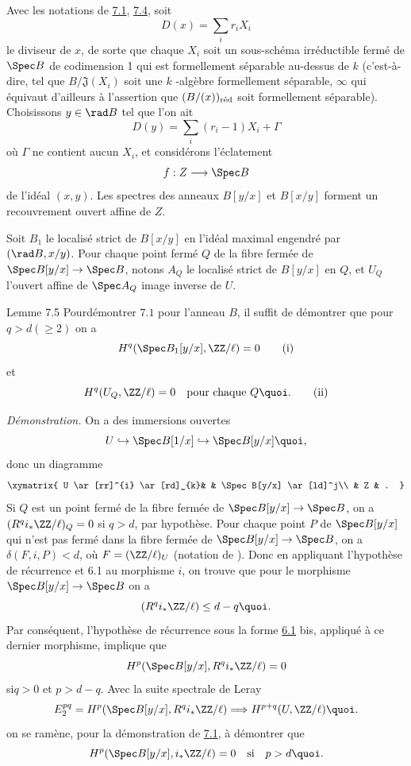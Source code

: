 \documentclass[10pt]{../fichiers-configuration-latex/smfart}
\begin{document}
Avec les notations de \hyperref[XIX.lem7.1]{7.1}, \hyperref[XIX.cor7.4]{7.4}, soit
$$
D(x)=\sum_{i}r_{i}X_{i}
$$
le diviseur de $x$, de sorte que chaque $X_{i}$ soit un sous-schéma
irréductible fermé de $\Spec B$ de codimension 1 qui est formellement
séparable au-dessus de $k$ (c'est-à-dire, tel que
$B/\mathfrak{J}(X_{i})$ soit une $k$ -algèbre formellement séparable,
$\infty$ qui équivaut d'ailleurs à l'assertion que $(B/(x))_{\text{\rm
réd}}$ soit formellement séparable). Choisissons $y\in\rad B$ tel que
l'on ait
$$
D(y)=\sum_{i}(r_{i}-1)X_{i}+\Gamma
$$
où $\Gamma$ ne contient aucun $X_{i}$, et considérons l'éclatement
$$
f:Z\longrightarrow \Spec B
$$
de l'idéal $(x,y)$. Les spectres des anneaux $B[y/x]$ et $B[x/y]$
forment un recouvrement ouvert affine de $Z$.

Soit $B_{1}$ le localisé strict de $B[x/y]$ en l'idéal maximal
engendré par $(\rad B,x/y)$. Pour chaque point fermé $Q$ de la fibre
fermée de $\Spec B[y/x]\rightarrow \Spec B$, notons $A_{Q}$ le
localisé strict de $B[y/x]$ en $Q$, et $U_{Q}$ l'ouvert affine de
$\Spec A_{Q}$ image inverse de $U$.

\begin{enonce*}{Lemme 7.5}
Pour\pageoriginale démontrer $7.1$ pour l'anneau $B$, il suffit de
démontrer que pour $q>d(\geq 2)$ on a
\begin{equation*}
H^{q}(\Spec B_{1}[y/x],\ZZ/\ell)=0\tag{i}
\end{equation*}
et
\begin{equation*}
H^{q}(U_{Q},\ZZ/\ell)=0\quad\text{pour chaque $Q$}{\quoi}.\tag{ii}
\end{equation*}
\end{enonce*}

\medskip
\noindent
\emph{Démonstration.} On a des immersions ouvertes
$$
U\hookrightarrow \Spec B[1/x]\hookrightarrow \Spec B[y/x]{\quoi},
$$
donc un diagramme
$$
\xymatrix{
U \ar[rr]^{i} \ar[rd]_{k}&         & \Spec B[y/x] \ar[ld]^j\\
                        &   Z     &      . 
}
$$
Si $Q$ est un point fermé de la fibre fermée de $\Spec
B[y/x]\rightarrow \Spec B$, on a
$(R^{q}i_{\ast}\ZZ/\ell)_{Q}=0$ si $q>d$, par hypothèse. Pour
chaque point $P$ de $\Spec B[y/x]$ qui n'est pas fermé dans la fibre
fermée de $\Spec B[y/x]\rightarrow \Spec B$, on a $\delta(F,i,P)<d$,
où $F=(\ZZ/\ell)_{U}$ (notation de ). Donc en appliquant
l'hypothèse de récurrence et 6.1 au morphisme $i$, on trouve que pour
le morphisme $\Spec B[y/x]\rightarrow \Spec B$ on a
$$
(R^{q}i_{\ast}\ZZ/\ell)\leq d-q{\quoi}.
$$
Par conséquent, l'hypothèse de récurrence sous la forme \hyperref[XIX.thm6.1]{6.1} bis,
appliqué à ce dernier morphisme, implique que 
$$
H^{p}(\Spec B[y/x],R^{q}i_{\ast}\ZZ/\ell)=0
$$
si\pageoriginale $q>0$ et $p>d-q$. Avec la suite spectrale de Leray
$$
E^{pq}_{2}=H^{p}(\Spec
B[y/x],R^{q}i_{\ast}\ZZ/\ell)\Longrightarrow
H^{p+q}(U,\ZZ / \ell){\quoi}.
$$
on se ramène, pour la démonstration de \hyperref[XIX.lem7.1]{7.1}, à démontrer que
$$
H^{p}(\Spec B[y/x],i_{\ast}\ZZ/\ell)=0\quad\text{\rm si}\quad
p>d{\quoi}.
$$
\end{document}
